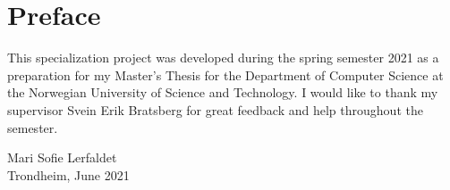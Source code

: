 \chapter*{Preface}
This specialization project was developed during the spring semester 2021 as a preparation for my Master's Thesis for the Department of Computer Science at the Norwegian University of Science and Technology. I would like to thank my supervisor Svein Erik Bratsberg for great feedback and help throughout the semester. 


\vspace{1cm}
\noindent
Mari Sofie Lerfaldet\\
Trondheim, June 2021